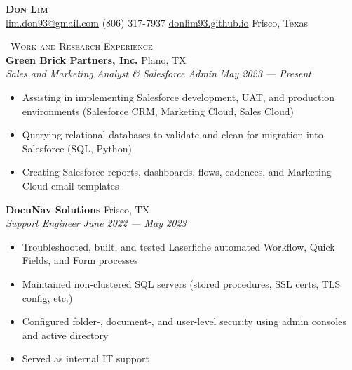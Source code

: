 \documentclass[a4paper,11pt]{article}
\newcommand{\header} [1] {
    \vspace{1mm}
    {\textsc{\large{\xrfill[0.5ex]{0.5pt}~#1~\xrfill[0.5ex]{0.5pt}}}} %
}
\begin{document}
\vspace*{-45pt}
\fontsize{11}{11.5}\selectfont


\vspace*{1mm}
\begin{center}
    {\Huge\textbf\textsc{{{Don Lim}}}}\\ \vspace{1mm}
    \href{mailto:lim.don93@gmail.com}{\Letter\space lim.don93@gmail.com}  \Mobilefone\space (806) 317-7937  \href{https://donlim93.github.io/}{\faGlobe\space donlim93.github.io}  \faMapMarker\space Frisco, Texas \\
\end{center}
\vspace*{-2mm}

\header{Work and Research Experience} \\
\vspace{1mm}
\textbf{Green Brick Partners, Inc.} \hfill Plano, TX \\
\textit{Sales and Marketing Analyst \& Salesforce Admin} \hfill  \emph{May 2023 --- Present} \\
\begin{itemize}
    \item Assisting in implementing Salesforce development, UAT, and production environments (Salesforce CRM, Marketing Cloud, Sales Cloud) 
    \item Querying relational databases to validate and clean for migration into Salesforce (SQL, Python)
    \item Creating Salesforce reports, dashboards, flows, cadences, and Marketing Cloud email templates
\end{itemize}
\vspace{1mm}

\textbf{DocuNav Solutions} \hfill Frisco, TX \\
\textit{Support Engineer} \hfill  \emph{June 2022 --- May 2023} \\
\begin{itemize}
    \item Troubleshooted, built, and tested Laserfiche automated Workflow, Quick Fields, and Form processes
    \item Maintained non-clustered SQL servers (stored procedures, SSL certs, TLS config, etc.)
    \item Configured folder-, document-, and user-level security using admin consoles and active directory
    \item Served as internal IT support
\end{itemize}    
\vspace{1mm}
\end{document}
